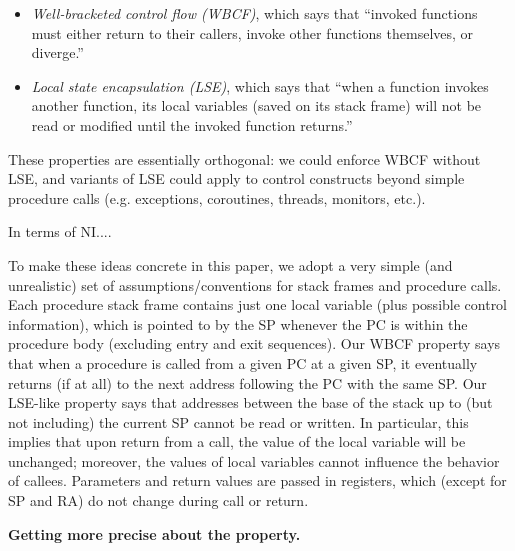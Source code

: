 \documentclass[conference]{IEEEtran}
\begin{document}
\begin{itemize}
\item \emph{Well-bracketed control flow (WBCF)}, which says that ``invoked functions must either return to their callers,
  invoke other functions themselves, or diverge.''
\item \emph{Local state encapsulation (LSE)}, which says that ``when a function invokes another function, its local variables
  (saved on its stack frame) will not be read or modified until the invoked function returns.''
\end{itemize}

These properties are essentially orthogonal: we could enforce WBCF without LSE, and variants of
LSE could apply to control constructs beyond simple procedure calls (e.g. exceptions, coroutines, threads, monitors, etc.).


In terms of NI....

To make these ideas concrete in this paper, we adopt a very simple (and unrealistic) set of assumptions/conventions for stack frames and procedure calls.
Each procedure stack frame contains just one local variable (plus possible control information), which is pointed to by
the SP whenever the PC is within the procedure body (excluding entry and exit sequences). Our WBCF property says that
when a procedure is called from a given PC at a given SP, it eventually returns (if at all) to the next
address following the PC with the same SP. Our LSE-like property says that addresses between the base of the stack
up to (but not including) the current SP cannot be read or written.
In particular, this implies that upon return from a call,
the value of the local variable will be unchanged; moreover, the values of local variables cannot influence the
behavior of callees. Parameters and return values are passed in registers, which (except for SP and RA) do not change
during call or return.

{\bf Getting more precise about the property.}
\end{document}
